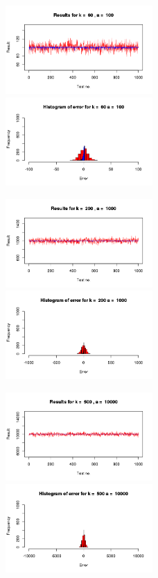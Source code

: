 \documentclass[a4paper,10pt]{article}
\begin{document}
\begin{figure}[h!]
       \includegraphics[width=0.5\textwidth]{result100.png}
       \includegraphics[width=0.5\textwidth]{errorHistogram100.png}
\end{figure}

\begin{figure}[h!]
       \includegraphics[width=0.5\textwidth]{result1000.png}
       \includegraphics[width=0.5\textwidth]{errorHistogram1000.png}
\end{figure}

\begin{figure}[h!]
       \includegraphics[width=0.5\textwidth]{result10000.png}
       \includegraphics[width=0.5\textwidth]{errorHistogram10000.png}
\end{figure}
\end{document}
